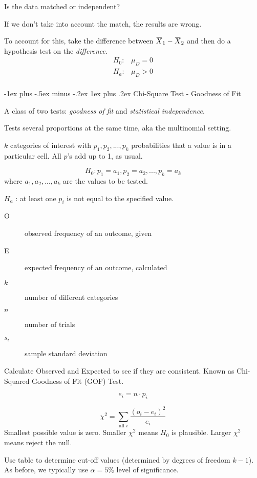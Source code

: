\documentclass[10pt,landscape]{article}
\makeatletter
\renewcommand{\subsubsection}{\@startsection{subsubsection}{3}{0mm}%
                                {-1ex plus -.5ex minus -.2ex}%
                                {1ex plus .2ex}%
                                {\normalfont\small\bfseries}}
\newcommand{\overbar}[1]{\mkern 1.5mu\overline{\mkern-1.5mu#1\mkern-1.5mu}\mkern 1.5mu}
\makeatother
\begin{document}
\begin{multicols*}{3}
Is the data matched or independent?

If we don't take into account the match, the results are wrong.

To account for this, take the difference between $\overbar{X}_1 - \overbar{X}_2$ and then do a hypothesis test on the \textit{difference}. 
\begin{align*}
H_0 : & \mu_D = 0 \\
H_a : & \mu_D > 0 \\
\end{align*}

\subsubsection{Chi-Square Test - Goodness of Fit}

A class of two tests: \textit{goodness of fit} and \textit{statistical independence}.

Tests several proportions at the same time, aka the multinomial setting.

$k$ categories of interest with $p_1, p_2, ... , p_k$ probabilities that a value is in a particular cell. All $p$'s add up to 1, as usual.

\[
H_0 : p_1 = a_1, p_2 = a_2, ... , p_k = a_k
\]
where $a_1, a_2, ... , a_k$ are the values to be tested.

$H_a$ : at least one $p_i$ is not equal to the specified value.

 \begin{description}
 \item [O] observed frequency of an outcome, given
 \item[E] expected frequency of an outcome, calculated
 \item[$k$]number of different categories
 \item[$n$]number of trials
 \item[$s_i$]sample standard deviation
 \end{description}

Calculate Observed and Expected to see if they are consistent. Known as Chi-Squared Goodness of Fit (GOF) Test.

\[
e_i = n \cdot p_i
\]

\[
\chi^2 = \sum\limits_{\text{all } i} \frac{  (o_i - e_i) ^2} {e_i}
\]
Smallest possible value is zero. Smaller $\chi^2$ means $H_0$ is plausible. Larger $\chi^2$ means reject the null. 

Use table to determine cut-off values (determined by degrees of freedom $k-1$). As before, we typically use $\alpha = 5\%$ level of significance.


\end{multicols*}
\end{document}
